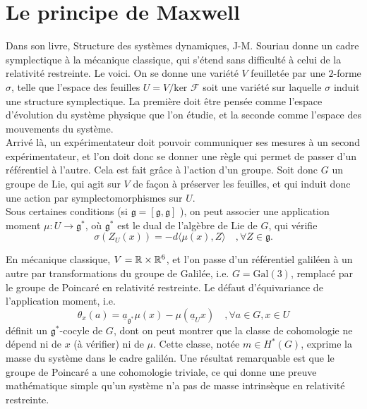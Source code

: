 \section{Le principe de Maxwell}

Dans son livre, Structure des systèmes dynamiques, J-M. Souriau donne un cadre symplectique à la mécanique classique, qui s'étend sans difficulté à celui de la relativité restreinte. Le voici. On se donne une variété $V$ feuilletée par une $2$-forme $\sigma$, telle que l'espace des feuilles $U=V/\text{ker }\mathcal F$ soit une variété sur laquelle $\sigma$ induit une structure symplectique. La première doit être pensée comme l'espace d'évolution du système physique que l'on étudie, et la seconde comme l'espace des mouvements du système.\\

Arrivé là, un expérimentateur doit pouvoir communiquer ses mesures à un second expérimentateur, et l'on doit donc se donner une règle qui permet de passer d'un référentiel à l'autre. Cela est fait grâce à l'action d'un groupe. Soit donc $G$ un groupe de Lie, qui agit sur $V$ de façon à préserver les feuilles, et qui induit donc une action par symplectomorphismes sur $U$.\\

Sous certaines conditions (si $\mathfrak g=[\mathfrak g,\mathfrak g]$ ), on peut associer une application moment $\mu : U\rightarrow \mathfrak g^*$, où $\mathfrak g^*$ est le dual de l'algèbre de Lie de $G$, qui vérifie
\[\sigma(Z_U(x))=-d\langle \mu(x),Z\rangle\quad, \forall Z\in \mathfrak g.\]

En mécanique classique, $V = \mathbb R\times \mathbb R^6$, et l'on passe d'un référentiel galiléen à un autre par transformations du groupe de Galilée, i.e. $G=\text{Gal}(3)$, remplacé par le groupe de Poincaré en relativité restreinte. Le défaut d'équivariance de l'application moment, i.e. 
\[\theta_x(a) = \underline{a}_{\mathfrak g^*} \mu(x)-\mu(\underline{a}_Ux)\quad ,\forall a\in G,x\in U \]
définit un $\mathfrak g^*$-cocyle de $G$, dont on peut montrer que la classe de cohomologie ne dépend ni de $x$ (à vérifier) ni de $\mu$. Cette classe, notée $m\in H^*(G)$, exprime la masse du système dans le cadre galilén. Une résultat remarquable est que le groupe de Poincaré a une cohomologie triviale, ce qui donne une preuve mathématique simple qu'un système n'a pas de masse intrinsèque en relativité restreinte.\\

